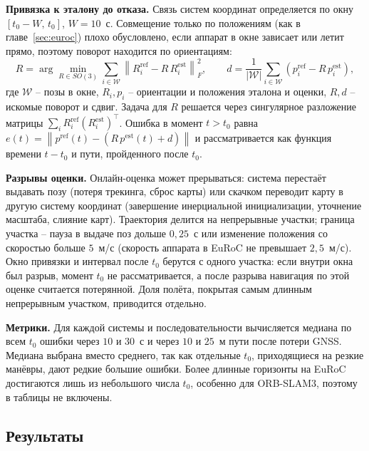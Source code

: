     \textbf{Привязка к эталону до отказа.}
    Связь систем координат определяется по окну $[t_0 - W,\, t_0]$, $W = 10$~с.
    Совмещение только по положениям (как в главе~\ref{sec:euroc}) плохо обусловлено, если аппарат в окне зависает или летит прямо, поэтому поворот находится по ориентациям:
    \begin{equation}\label{eq:window_rot}
        R = \arg\min_{R \in SO(3)} \sum_{i \in \mathcal{W}} \left\| R_i^{\mathrm{ref}} - R\, R_i^{\mathrm{est}} \right\|_F^2,
        \qquad
        d = \frac{1}{|\mathcal{W}|} \sum_{i \in \mathcal{W}} \left( p_i^{\mathrm{ref}} - R\, p_i^{\mathrm{est}} \right),
    \end{equation}
    где $\mathcal{W}$ -- позы в окне, $R_i, p_i$ -- ориентации и положения эталона и оценки, $R, d$ -- искомые поворот и сдвиг.
    Задача для $R$ решается через сингулярное разложение матрицы $\sum_i R_i^{\mathrm{ref}} (R_i^{\mathrm{est}})^\top$.
    Ошибка в момент $t > t_0$ равна $e(t) = \left\| p^{\mathrm{ref}}(t) - (R\, p^{\mathrm{est}}(t) + d) \right\|$ и рассматривается как функция времени $t - t_0$ и пути, пройденного после $t_0$.

    \textbf{Разрывы оценки.}
    Онлайн-оценка может прерываться: система перестаёт выдавать позу (потеря трекинга, сброс карты) или скачком переводит карту в другую систему координат (завершение инерциальной инициализации, уточнение масштаба, слияние карт).
    Траектория делится на непрерывные участки; граница участка -- пауза в выдаче поз дольше $0{,}25$~с или изменение положения со скоростью больше $5$~м/с (скорость аппарата в EuRoC не превышает $2{,}5$~м/с).
    Окно привязки и интервал после $t_0$ берутся с одного участка: если внутри окна был разрыв, момент $t_0$ не рассматривается, а после разрыва навигация по этой оценке считается потерянной.
    Доля полёта, покрытая самым длинным непрерывным участком, приводится отдельно.

    \textbf{Метрики.}
    Для каждой системы и последовательности вычисляется медиана по всем $t_0$ ошибки через $10$ и $30$~с и через $10$ и $25$~м пути после потери GNSS.
    Медиана выбрана вместо среднего, так как отдельные $t_0$, приходящиеся на резкие манёвры, дают редкие большие ошибки.
    Более длинные горизонты на EuRoC достигаются лишь из небольшого числа $t_0$, особенно для ORB-SLAM3, поэтому в таблицы не включены.

    \subsection{Результаты}

